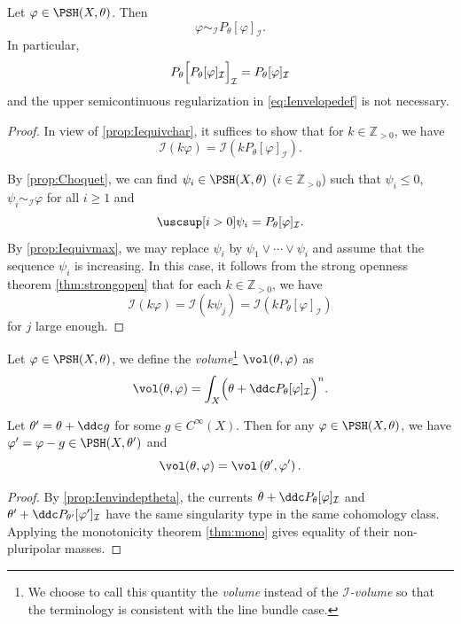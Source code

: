 \begin{proposition}\label{prop:Ienvprojection}
    Let $\varphi\in \PSH(X,\theta)$. Then
    \[
        \varphi\sim_{\mathcal{I}}  P_{\theta}[\varphi]_{\mathcal{I}}.
    \]
    In particular,
    \[
        P_{\theta}\Bigl[ P_{\theta}[\varphi]_{\mathcal{I}} \Bigr]_{\mathcal{I}}=P_{\theta}[\varphi]_{\mathcal{I}}
    \]
    and the upper semicontinuous regularization in \eqref{eq:Ienvelopedef} is not necessary.
\end{proposition}
\begin{proof}
    In view of \cref{prop:Iequivchar}, it suffices to show that for $k \in \mathbb{Z}_{>0}$, we have
    \begin{equation}\label{eq:IenvelopepreservLelong}
        \mathcal{I}(k\varphi)=\mathcal{I}(kP_{\theta}[\varphi]_{\mathcal{I}}).
    \end{equation}

    By \cref{prop:Choquet}, we can find $\psi_i\in \PSH(X,\theta)$ ($i\in \mathbb{Z}_{>0}$) such that $\psi_i\leq 0$, $\psi_i\sim_{\mathcal{I}}\varphi$ for all $i\geq 1$ and
    \[
        \uscsup[i>0]\psi_i=P_{\theta}[\varphi]_{\mathcal{I}}.
    \]
    By \cref{prop:Iequivmax}, we may replace $\psi_i$ by $\psi_1\lor\cdots\lor\psi_i$ and assume that the sequence $\psi_i$ is increasing. In this case, it follows from the strong openness theorem \cref{thm:strongopen} that for each $k\in \mathbb{Z}_{>0}$, we have
    \[
        \mathcal{I}(k\varphi)=\mathcal{I}(k\psi_j)=\mathcal{I} (kP_{\theta}[\varphi]_{\mathcal{I}})
    \]
    for $j$ large enough.
\end{proof}




\begin{definition}\label{def:volqpsh}
    Let $\varphi\in \PSH(X,\theta)$, we define the \emph{volume}\footnote{We choose to call this quantity the \emph{volume} instead of the \emph{$\mathcal{I}$-volume} so that the terminology is consistent with the line bundle case.} $\vol(\theta,\varphi)$ as
    \[
        \vol(\theta,\varphi)=\int_X \Bigl(\theta+\ddc P_{\theta}[\varphi]_{\mathcal{I}}  \Bigr)^n.
    \]
    \index{$\vol(\theta,\varphi)$}
\end{definition}

\begin{proposition}\label{prop:voldeponlyoncurr}
    Let $\theta'=\theta+\ddc g$ for some $g\in C^{\infty}(X)$. Then for any $\varphi\in \PSH(X,\theta)$, we have $\varphi'=\varphi-g\in \PSH(X,\theta')$ and
    \[
        \vol(\theta,\varphi)=  \vol\left(\theta',\varphi'\right).
    \]
\end{proposition}
\begin{proof}
    By \cref{prop:Ienvindeptheta}, the currents $\theta+\ddc P_\theta[\varphi]_{\mathcal I}$ and $\theta'+\ddc P_{\theta'}[\varphi']_{\mathcal I}$ have the same singularity type in the same cohomology class. Applying the monotonicity theorem \cref{thm:mono} gives equality of their non-pluripolar masses.
\end{proof}

